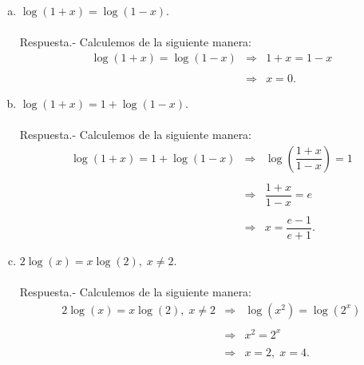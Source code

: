 \begin{enumerate}[\bfseries 1.]
\begin{enumerate}[(a)]
	    \item $\log(1+x)=\log(1-x)$.\\\\
		Respuesta.-\; Calculemos de la siguiente manera:
		$$
		\begin{array}{rcl}
		    \log(1+x)=\log(1-x) &\Rightarrow& 1+x=1-x\\\\
					&\Rightarrow& x=0.
		\end{array}
		$$
		\vspace{.5cm}

	    \item $\log(1+x)=1+\log(1-x)$.\\\\
		Respuesta.-\; Calculemos de la siguiente manera:
		$$
		\begin{array}{rcl}
		    \log(1+x)=1+\log(1-x) &\Rightarrow& \log\left(\dfrac{1+x}{1-x}\right)=1\\\\
					  &\Rightarrow& \dfrac{1+x}{1-x}=e\\\\
					  &\Rightarrow& x=\dfrac{e-1}{e+1}.
		\end{array}
		$$
		\vspace{.5cm}

	    \item $2\log(x) = x\log(2), \; x\neq 2$.\\\\
		Respuesta.-\; Calculemos de la siguiente manera:
		$$
		\begin{array}{rcl}
		    2\log(x) = x\log(2), \; x\neq 2 &\Rightarrow& \log(x^2)=\log(2^x)\\\\
						     &\Rightarrow& x^2=2^x\\\\
						     &\Rightarrow& x=2,\; x=4.
		\end{array}
		$$
		\vspace{.5cm}


\end{enumerate}
\end{enumerate}
